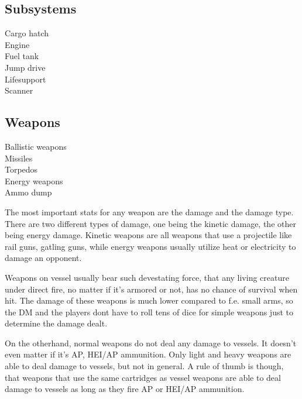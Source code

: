 \subsection{Subsystems}
\label{sub:Vessel-Subsystems}

\begin{description}
  \item[Cargo hatch]
  \item[Engine]
  \item[Fuel tank]
  \item[Jump drive]
  \item[Lifesupport]
  \item[Scanner]
\end{description}

\subsection{Weapons}
\label{sub:Vessel-Weapons}

\begin{description}
  \item[Ballistic weapons]
  \item[Missiles]
  \item[Torpedos]
  \item[Energy weapons]
  \item[Ammo dump]
\end{description}

The most important stats for any weapon are the damage and the damage type. There are two different types of damage, one being the kinetic damage, the other being energy damage. Kinetic weapons are all weapons that use a projectile like rail guns, gatling guns, while energy weapons usually utilize heat or electricity to damage an opponent.

Weapons on vessel usually bear such devestating force, that any living creature under direct fire, no matter if it's armored or not, has no chance of survival when hit. The damage of these weapons is much lower compared to f.e. small arms, so the DM and the players dont have to roll tens of dice for simple weapons just to determine the damage dealt.

On the otherhand, normal weapons do not deal any damage to vessels. It doesn't even matter if it's AP, HEI/AP ammunition. Only light and heavy weapons are able to deal damage to vessels, but not in general. A rule of thumb is though, that weapons that use the same cartridges as vessel weapons are able to deal damage to vessels as long as they fire AP or HEI/AP ammunition.

